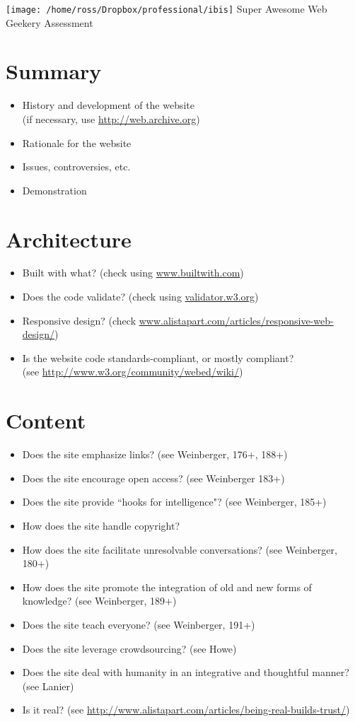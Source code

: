 \documentclass[11pt,oneside,letterpaper]{article}
\begin{document}
\reversemarginpar
\texttt{[image: /home/ross/Dropbox/professional/ibis]}
{\LARGE Super Awesome Web Geekery Assessment}\\[1em]

\thispagestyle{plain}
\section{Summary}

\begin{itemize}
\item History and development of the website \\(if necessary, use \url{http://web.archive.org})
\item Rationale for the website
\item Issues, controversies, etc.
\item Demonstration
\end{itemize}

\section{Architecture}
\begin{itemize}
\item Built with what? (check using \url{www.builtwith.com})
\item Does the code validate? (check using \url{validator.w3.org})
\item Responsive design? (check \url{www.alistapart.com/articles/responsive-web-design/})
\item Is the website code standards-compliant, or mostly compliant? \\(see \url{http://www.w3.org/community/webed/wiki/})
\end{itemize}

\section{Content}
\begin{itemize}
\item Does the site emphasize links? (see Weinberger, 176+, 188+)
\item Does the site encourage open access? (see Weinberger 183+)
\item Does the site provide ``hooks for intelligence"? (see Weinberger, 185+)
\item How does the site handle copyright?
\item How does the site facilitate unresolvable conversations? (see Weinberger, 180+)
\item How does the site promote the integration of old and new forms of knowledge? (see Weinberger, 189+)
\item Does the site teach everyone? (see Weinberger, 191+)
\item Does the site leverage crowdsourcing? (see Howe)
\item Does the site deal with humanity in an integrative and thoughtful manner? (see Lanier)
\item Is it real? (see \url{http://www.alistapart.com/articles/being-real-builds-trust/})
\end{itemize}
\end{document}
